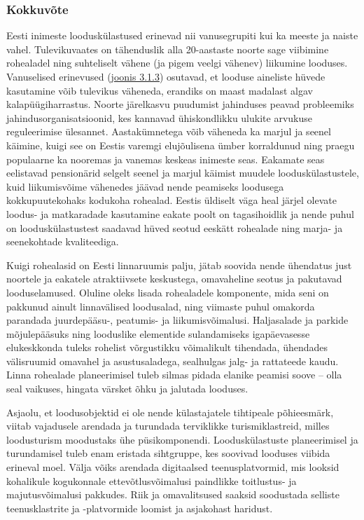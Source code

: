 \documentclass[estonian,]{article}
\begin{document}
\hypertarget{kokkuvuxf5te-7}{%
\subsubsection*{Kokkuvõte}\label{kokkuvuxf5te-7}}

Eesti inimeste looduskülastused erinevad nii vanusegrupiti kui ka meeste ja naiste vahel. Tulevikuvaates on tähenduslik alla 20-aastaste noorte sage viibimine rohealadel ning suhteliselt vähene (ja pigem veelgi vähenev) liikumine looduses. Vanuselised erinevused (\protect\hyperlink{figure313}{joonis 3.1.3}) osutavad, et looduse aineliste hüvede kasutamine võib tulevikus väheneda, erandiks on maast madalast algav kalapüügiharrastus. Noorte järelkasvu puudumist jahinduses peavad probleemiks jahindusorganisatsioonid, kes kannavad ühiskondlikku ulukite arvukuse reguleerimise ülesannet. Aastakümnetega võib väheneda ka marjul ja seenel käimine, kuigi see on Eestis varemgi elujõulisena ümber korraldunud ning praegu populaarne ka nooremas ja vanemas keskeas inimeste seas. Eakamate seas eelistavad pensionärid selgelt seenel ja marjul käimist muudele looduskülastustele, kuid liikumisvõime vähenedes jäävad nende peamiseks loodusega kokkupuutekohaks kodukoha rohealad. Eestis üldiselt väga heal järjel olevate loodus- ja matkaradade kasutamine eakate poolt on tagasihoidlik ja nende puhul on looduskülastustest saadavad hüved seotud eeskätt rohealade ning marja- ja seenekohtade kvaliteediga.

Kuigi rohealasid on Eesti linnaruumis palju, jätab soovida nende ühendatus just noortele ja eakatele atraktiivsete keskustega, omavaheline seotus ja pakutavad looduselamused. Oluline oleks lisada rohealadele komponente, mida seni on pakkunud ainult linnavälised loodusalad, ning viimaste puhul omakorda parandada juurdepääsu-, peatumis- ja liikumisvõimalusi. Haljasalade ja parkide mõjulepääsuks ning looduslike elementide sulandamiseks igapäevasesse elukeskkonda tuleks rohelist võrgustikku võimalikult tihendada, ühendades välisruumid omavahel ja asustusaladega, sealhulgas jalg- ja rattateede kaudu. Linna rohealade planeerimisel tuleb silmas pidada elanike peamisi soove -- olla seal vaikuses, hingata värsket õhku ja jalutada looduses.

Asjaolu, et loodusobjektid ei ole nende külastajatele tihtipeale põhieesmärk, viitab vajadusele arendada ja turundada terviklikke turismiklastreid, milles loodusturism moodustaks ühe püsikomponendi. Looduskülastuste planeerimisel ja turundamisel tuleb enam eristada sihtgruppe, kes soovivad looduses viibida erineval moel. Välja võiks arendada digitaalsed teenusplatvormid, mis looksid kohalikule kogukonnale ettevõtlusvõimalusi paindlikke toitlustus- ja majutusvõimalusi pakkudes. Riik ja omavalitsused saaksid soodustada selliste teenusklastrite ja -platvormide loomist ja asjakohast haridust.
\end{document}
